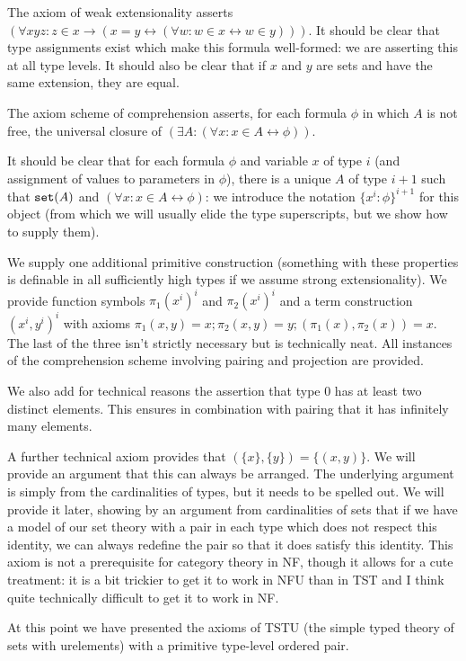 \documentclass[12pt]{article}
\begin{document}
The axiom of weak extensionality asserts $(\forall xyz:z \in x \rightarrow (x=y \leftrightarrow (\forall w:w \in x \leftrightarrow w \in y)))$.  It should be clear that type assignments
exist which make this formula well-formed:  we are asserting this at all type levels.  It should also be clear that if $x$ and $y$ are sets and have the same extension, they are equal.

The axiom scheme of comprehension asserts, for each formula $\phi$ in which $A$ is not free, the universal closure of $(\exists A:(\forall x:x \in A \leftrightarrow \phi))$.

It should be clear that for each formula $\phi$ and variable $x$ of type $i$ (and assignment of values to parameters in $\phi$), there is a unique $A$ of type $i+1$ such that ${\tt set}(A)$ and
$(\forall x:x \in A \leftrightarrow \phi)$:  we introduce the notation $\{x^i:\phi\}^{i+1}$ for this object (from which we will usually elide the type superscripts, but we show how to supply them).

We supply one additional primitive construction (something with these properties is definable in all sufficiently high types if we assume strong extensionality).  We provide function symbols
$\pi_1(x^i)^{i}$ and $\pi_2(x^i)^{i}$ and a term construction $(x^i,y^i)^{i}$ with axioms $\pi_1(x,y) = x; \pi_2(x,y)=y; (\pi_1(x),\pi_2(x))=x$.  The last of the three isn't strictly necessary but is technically neat.  All instances of the comprehension scheme involving pairing and projection are provided.

We also add for technical reasons the assertion that type 0 has at least two distinct elements.  This ensures in combination with pairing that it has infinitely many elements.

A further technical axiom provides that $(\{x\},\{y\}) = \{(x,y)\}$.  We will provide an argument that this can always be arranged.   The underlying argument is simply from the cardinalities of types, but it needs to be spelled out.  We will provide it later, showing by an argument from cardinalities of sets that if we have a model of our set theory with a pair in each type which does not respect this identity, we can always redefine the pair so that it does satisfy this identity.   This axiom is not a prerequisite for category theory in NF, though it allows for a cute treatment:  it is a bit trickier to get it to work in NFU than in TST and I think quite technically difficult to get it to work in NF.

At this point we have presented the axioms of TSTU (the simple typed theory of sets with urelements) with a primitive type-level ordered pair.
\end{document}
